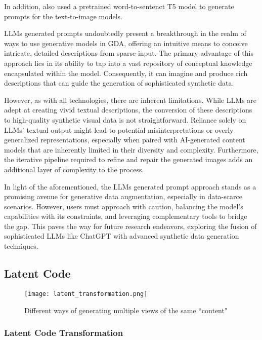 \documentclass[preprint,12pt,authoryear]{elsarticle}
\begin{document}
In addition, \cite{151_synthetic_ready} also used a pretrained word-to-sentenct T5 model to generate prompts for the text-to-image models.

LLMs generated prompts undoubtedly present a breakthrough in the realm of ways to use generative models in GDA, offering an intuitive means to conceive intricate, detailed descriptions from sparse input. The primary advantage of this approach lies in its ability to tap into a vast repository of conceptual knowledge encapsulated within the model. Consequently, it can imagine and produce rich descriptions that can guide the generation of sophisticated synthetic data.

However, as with all technologies, there are inherent limitations. While LLMs are adept at creating vivid textual descriptions, the conversion of these descriptions to high-quality synthetic visual data is not straightforward. Reliance solely on LLMs' textual output might lead to potential misinterpretations\cite{151_synthetic_ready} or overly generalized representations, especially when paired with AI-generated content models that are inherently limited in their diversity and complexity. Furthermore, the iterative pipeline required to refine and repair the generated images adds an additional layer of complexity to the process.

In light of the aforementioned, the LLMs generated prompt approach stands as a promising avenue for generative data augmentation, especially in data-scarce scenarios. However, users must approach with caution, balancing the model's capabilities with its constraints, and leveraging complementary tools to bridge the gap. This paves the way for future research endeavors, exploring the fusion of sophisticated LLMs like ChatGPT with advanced synthetic data generation techniques.

\subsection{Latent Code}

\begin{figure}
    \centering    \centerline{\texttt{[image: latent\_transformation.png]}}
    \caption{Different ways of generating multiple views of the same “content"\cite{143_representation} }
    \label{fig:latent_transformation}
\end{figure}

\subsubsection{Latent Code Transformation}
\end{document}
